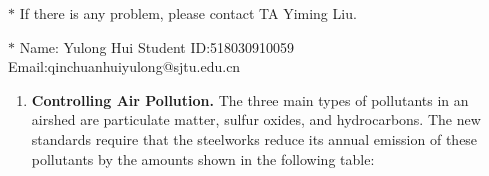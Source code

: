 \documentclass[12pt,a4paper]{article}
\theoremstyle{definition}
\begin{document}
\noindent

\noindent{}
\begin{center}
\footnotesize{\color{red}$*$ If there is any problem, please contact TA Yiming Liu. }

\footnotesize{\color{blue}$*$ Name: Yulong Hui  \quad Student ID:518030910059 \quad Email:qinchuanhuiyulong@sjtu.edu.cn}
\end{center}
\begin{enumerate}

   \item 
   \textbf{Controlling Air Pollution. }The three main types of pollutants in an airshed are particulate matter, sulfur oxides, and hydrocarbons. The new standards require that the steelworks reduce its annual emission of these pollutants by the amounts shown in the following table: 
	\begin{table}[h]
		\footnotesize
		\centering
	    \label{standards}
	    \renewcommand\arraystretch{1.1}
		\begin{tabular}{lc}
			

\end{tabular}
\end{table}
\end{enumerate}
\end{document}
